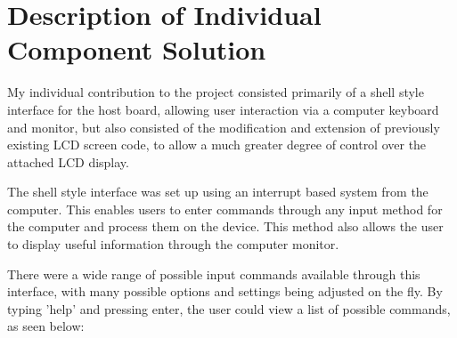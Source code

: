 \section{Description of Individual Component Solution}

My individual contribution to the project consisted primarily of a shell style 
interface for the host board, allowing user interaction via a computer keyboard 
and monitor, but also consisted of the modification and extension of previously 
existing LCD screen code, to allow a much greater degree of control over the 
attached LCD display. 

The shell style interface was set up using an interrupt based system from the 
computer. This enables users to enter commands through any input method for 
the computer and process them on the device. This method also allows the user
to display useful information through the computer monitor.

There were a wide range of possible input commands available through this 
interface, with many possible options and settings being adjusted on the fly. 
By typing 'help' and pressing enter, the user could view a list of possible 
commands, as seen below: 

